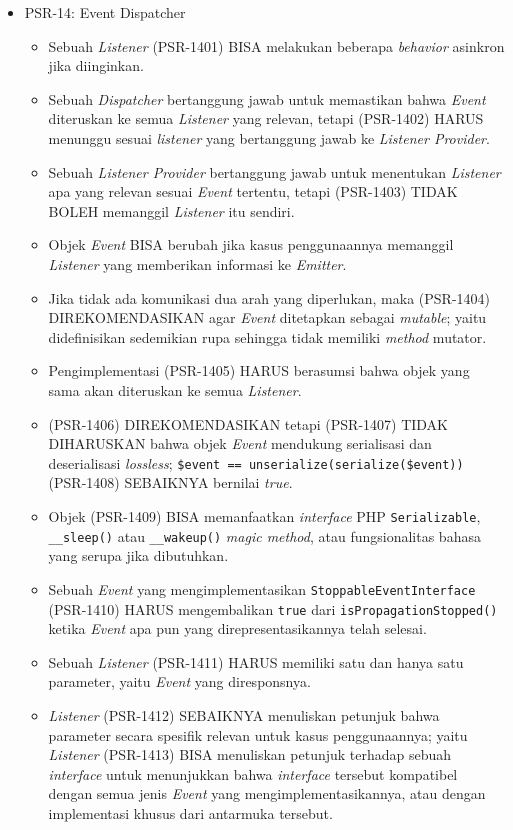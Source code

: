 \documentclass[a4paper,twoside]{article}
\begin{document}
\begin{enumerate}
\begin{enumerate}
\begin{itemize}
				
				\item PSR-14: Event Dispatcher
				\label{subsubsec:psr14}
				\begin{itemize}
					\item Sebuah \textit{Listener} (PSR-1401) BISA melakukan beberapa \textit{behavior} asinkron jika diinginkan.
					\item Sebuah \textit{Dispatcher} bertanggung jawab untuk memastikan bahwa \textit{Event} diteruskan ke semua \textit{Listener} yang relevan, tetapi (PSR-1402) HARUS menunggu sesuai \textit{listener} yang bertanggung jawab ke \textit{Listener Provider}.
					\item Sebuah \textit{Listener Provider} bertanggung jawab untuk menentukan \textit{Listener} apa yang relevan sesuai \textit{Event} tertentu, tetapi (PSR-1403) TIDAK BOLEH memanggil \textit{Listener} itu sendiri.
					\item Objek \textit{Event} BISA berubah jika kasus penggunaannya memanggil \textit{Listener} yang memberikan informasi ke \textit{Emitter}.
					\item Jika tidak ada komunikasi dua arah yang diperlukan, maka (PSR-1404) DIREKOMENDASIKAN agar \textit{Event} ditetapkan sebagai \textit{mutable}; yaitu didefinisikan sedemikian rupa sehingga tidak memiliki \textit{method} mutator.
					\item Pengimplementasi (PSR-1405) HARUS berasumsi bahwa objek yang sama akan diteruskan ke semua \textit{Listener}.
					\item (PSR-1406) DIREKOMENDASIKAN tetapi (PSR-1407) TIDAK DIHARUSKAN bahwa objek \textit{Event} mendukung serialisasi dan deserialisasi \textit{lossless}; \verb|$event == unserialize(serialize($event))| (PSR-1408) SEBAIKNYA bernilai  \textit{true}.
					\item Objek (PSR-1409) BISA memanfaatkan \textit{interface} PHP \verb|Serializable|, \verb|__sleep()| atau \verb|__wakeup()| \textit{magic method}, atau fungsionalitas bahasa yang serupa jika dibutuhkan.
					\item Sebuah \textit{Event} yang mengimplementasikan \verb|StoppableEventInterface| (PSR-1410) HARUS mengembalikan \verb|true| dari \verb|isPropagationStopped()| ketika \textit{Event} apa pun yang direpresentasikannya telah selesai.
					\item Sebuah \textit{Listener} (PSR-1411) HARUS memiliki satu dan hanya satu parameter, yaitu \textit{Event} yang diresponsnya.
					\item \textit{Listener} (PSR-1412) SEBAIKNYA menuliskan petunjuk bahwa parameter secara spesifik relevan untuk kasus penggunaannya; yaitu \textit{Listener} (PSR-1413) BISA menuliskan petunjuk terhadap sebuah \textit{interface} untuk menunjukkan bahwa \textit{interface} tersebut kompatibel dengan semua jenis \textit{Event} yang mengimplementasikannya, atau dengan implementasi khusus dari antarmuka tersebut.
				\end{itemize}
				

\end{itemize}
\end{enumerate}
\end{enumerate}
\end{document}
